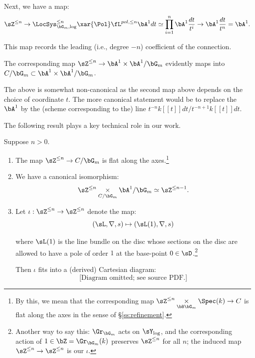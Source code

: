 Next, we have a map:
%
\[
\sZ^{\leq n} \to \LocSys_{\bG_m,\log}^{\leq n}
\xar{\Pol} \fL^{pol,\leq n} \bA^1 dt
\simeq \prod_{i=1}^n \bA^1 \frac{dt}{t^i}
\to \bA^1 \frac{dt}{t^n} = \bA^1.
\]

 This map records the leading (i.e.,
degree $-n$) coefficient of the connection.

The corresponding map
$\sZ^{\leq n} \to \bA^1 \times \bA^1/\bG_m$ evidently
maps into $C/\bG_m \subset \bA^1 \times \bA^1/\bG_m$.

\begin{rem}
\notready

The above is somewhat non-canonical as the second
map above depends
on the choice of coordinate $t$.
The more canonical statement would be
to replace the $\bA^1$ by the (scheme corresponding
to the) line $t^{-n} k[[t]]dt/t^{-n+1}k[[t]] dt$.

\end{rem}

The following result plays a key technical role in our work.

\begin{prop}
\notready\label{p:z-flat-axes}

Suppose $n>0$.

\begin{enumerate}

\item \label{i:z-axes-1}

The map $\sZ^{\leq n} \to C/\bG_m$ is flat
along the axes.\footnote{By this, we mean that the
corresponding map $\sZ^{\leq n} \underset{\bB\bG_m}\times \Spec(k) \to C$ is flat along the axes in the
sense of \S \ref{ss:refinement}.}

\item \label{i:z-axes-2}

We have a canonical isomorphism:
%
\[
\sZ^{\leq n} \underset{C/\bG_m}{\times} \bA^1/\bG_m
\simeq \sZ^{\leq n-1}.
\]

\item \label{i:z-axes-3}

Let $\iota:\sZ^{\leq n} \to \sZ^{\leq n}$
denote the map:
%
\[
(\sL,\nabla,s) \mapsto (\sL(1),\nabla,s)
\]


where $\sL(1)$ is the line bundle on the disc
whose sections on the disc are allowed
to have a pole of order $1$ at the base-point $0 \in \sD$.\footnote{Another way to say this:
$\Gr_{\bG_m}$ acts on $\sY_{\log}$, and the corresponding
action of $1 \in \bZ = \Gr_{\bG_m}(k)$ preserves
$\sZ^{\leq n}$ for all $n$; the induced map
$\sZ^{\leq n} \to \sZ^{\leq n}$ is our $\iota$.}

Then $\iota$ fits into a (derived) Cartesian diagram:
%
\[
\text{[Diagram omitted; see source PDF.]}
\]

\end{enumerate}

\end{prop}

